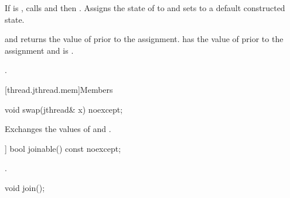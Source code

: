 \begin{itemdescr}
\pnum
\effects
If  is ,
calls  and then .
Assigns the state of  to 
and sets  to a default constructed state.

\pnum
\ensures
{}
and  returns the value of 
prior to the assignment.
 has the value of 
prior to the assignment
and  is .

\pnum
\returns
{}.
\end{itemdescr}

[thread.jthread.mem]{Members}

%
\begin{itemdecl}
void swap(jthread& x) noexcept;
\end{itemdecl}

\begin{itemdescr}
\pnum
\effects
Exchanges the values of  and .
\end{itemdescr}

%
\begin{itemdecl}
[[nodiscard]] bool joinable() const noexcept;
\end{itemdecl}

\begin{itemdescr}
\pnum
\returns
{}.
\end{itemdescr}

%
\begin{itemdecl}
void join();
\end{itemdecl}


